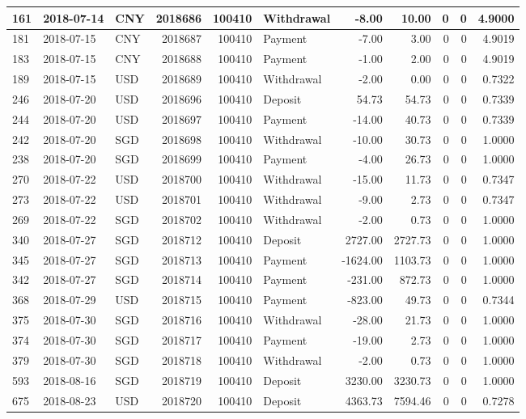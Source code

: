 \documentclass[]{article}
\begin{document}
\begin{table}[H]
\begin{tabular}{l|l|l|r|r|l|r|r|r|r|r}
\hline
161 & 2018-07-14 & CNY & 2018686 & 100410 & Withdrawal & -8.00 & 10.00 & 0 & 0 & 4.9000\\
\hline
181 & 2018-07-15 & CNY & 2018687 & 100410 & Payment & -7.00 & 3.00 & 0 & 0 & 4.9019\\
\hline
183 & 2018-07-15 & CNY & 2018688 & 100410 & Payment & -1.00 & 2.00 & 0 & 0 & 4.9019\\
\hline
189 & 2018-07-15 & USD & 2018689 & 100410 & Withdrawal & -2.00 & 0.00 & 0 & 0 & 0.7322\\
\hline
246 & 2018-07-20 & USD & 2018696 & 100410 & Deposit & 54.73 & 54.73 & 0 & 0 & 0.7339\\
\hline
244 & 2018-07-20 & USD & 2018697 & 100410 & Payment & -14.00 & 40.73 & 0 & 0 & 0.7339\\
\hline
242 & 2018-07-20 & SGD & 2018698 & 100410 & Withdrawal & -10.00 & 30.73 & 0 & 0 & 1.0000\\
\hline
238 & 2018-07-20 & SGD & 2018699 & 100410 & Payment & -4.00 & 26.73 & 0 & 0 & 1.0000\\
\hline
270 & 2018-07-22 & USD & 2018700 & 100410 & Withdrawal & -15.00 & 11.73 & 0 & 0 & 0.7347\\
\hline
273 & 2018-07-22 & USD & 2018701 & 100410 & Withdrawal & -9.00 & 2.73 & 0 & 0 & 0.7347\\
\hline
269 & 2018-07-22 & SGD & 2018702 & 100410 & Withdrawal & -2.00 & 0.73 & 0 & 0 & 1.0000\\
\hline
340 & 2018-07-27 & SGD & 2018712 & 100410 & Deposit & 2727.00 & 2727.73 & 0 & 0 & 1.0000\\
\hline
345 & 2018-07-27 & SGD & 2018713 & 100410 & Payment & -1624.00 & 1103.73 & 0 & 0 & 1.0000\\
\hline
342 & 2018-07-27 & SGD & 2018714 & 100410 & Payment & -231.00 & 872.73 & 0 & 0 & 1.0000\\
\hline
368 & 2018-07-29 & USD & 2018715 & 100410 & Payment & -823.00 & 49.73 & 0 & 0 & 0.7344\\
\hline
375 & 2018-07-30 & SGD & 2018716 & 100410 & Withdrawal & -28.00 & 21.73 & 0 & 0 & 1.0000\\
\hline
374 & 2018-07-30 & SGD & 2018717 & 100410 & Payment & -19.00 & 2.73 & 0 & 0 & 1.0000\\
\hline
379 & 2018-07-30 & SGD & 2018718 & 100410 & Withdrawal & -2.00 & 0.73 & 0 & 0 & 1.0000\\
\hline
593 & 2018-08-16 & SGD & 2018719 & 100410 & Deposit & 3230.00 & 3230.73 & 0 & 0 & 1.0000\\
\hline
675 & 2018-08-23 & USD & 2018720 & 100410 & Deposit & 4363.73 & 7594.46 & 0 & 0 & 0.7278\\

\end{tabular}
\end{table}
\end{document}
